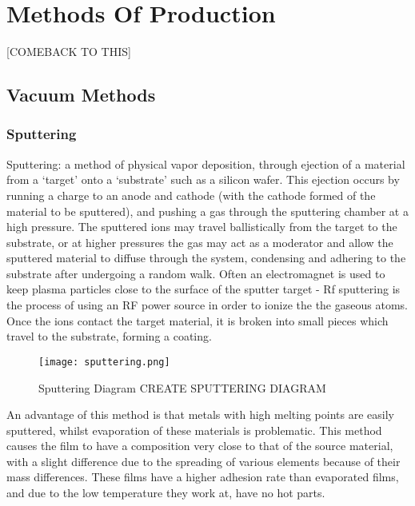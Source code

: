 \section{Methods Of Production}


[COMEBACK TO THIS]
\subsection{Vacuum Methods}

\subsubsection{Sputtering}
Sputtering: a method of physical vapor deposition, through ejection of a material from a `target' onto a `substrate' such as a silicon wafer. This ejection occurs by running a charge to an anode and cathode (with the cathode formed of the material to be sputtered), and pushing a gas through the sputtering chamber at a high pressure. The sputtered ions may travel ballistically from the target to the substrate, or at higher pressures the gas may act as a moderator and allow the sputtered material to diffuse through the system, condensing and adhering to the substrate after undergoing a random walk.
Often an electromagnet is used to keep plasma particles close to the surface of the sputter target - Rf sputtering is the process of using an RF power source in order to ionize the the gaseous atoms. Once the ions contact the target material, it is broken into small pieces which travel to the substrate, forming a coating.
\begin{figure}
\texttt{[image: sputtering.png]}
\caption{Sputtering Diagram CREATE SPUTTERING DIAGRAM}
    \label{fig:Sputtering}
\end{figure}
An advantage of this method is that metals with high melting points are easily sputtered, whilst evaporation of these materials is problematic. This method causes the film to have a composition very close to that of the source material, with a slight difference due to the spreading of various elements because of their mass differences. These films have a higher adhesion rate than evaporated films, and due to the low temperature they work at, have no hot parts.

